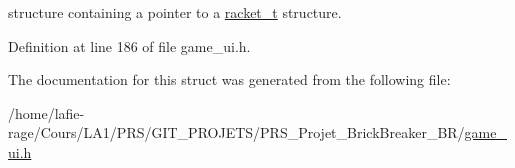 structure containing a pointer to a \hyperlink{structracket__t}{racket\+\_\+t} structure. 

Definition at line 186 of file game\+\_\+ui.\+h.



The documentation for this struct was generated from the following file\+:\begin{DoxyCompactItemize}
\item 
/home/lafie-\/rage/\+Cours/\+L\+A1/\+P\+R\+S/\+G\+I\+T\+\_\+\+P\+R\+O\+J\+E\+T\+S/\+P\+R\+S\+\_\+\+Projet\+\_\+\+Brick\+Breaker\+\_\+\+B\+R/\hyperlink{game__ui_8h}{game\+\_\+ui.\+h}\end{DoxyCompactItemize}
